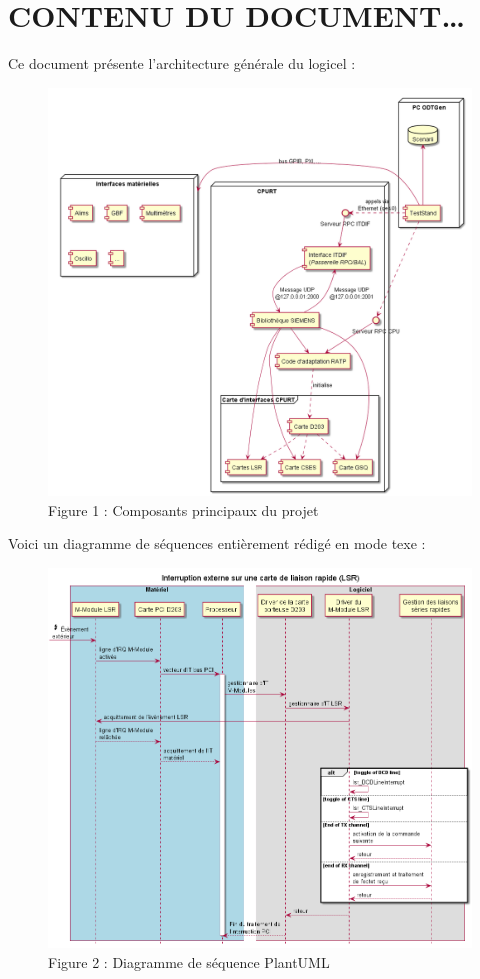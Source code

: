 \documentclass[
  10pt,
]{book}
\begin{document}
\hypertarget{contenu-du-document}{%
\section{CONTENU DU DOCUMENT\ldots{}}\label{contenu-du-document}}

Ce document présente l'architecture générale du logicel :

\begin{figure}
\centering
\includegraphics{./tex2pdf.-1f50f5654d7493c4/ae1a89740bab541d6c24e90760040d81d9c06d87.png}
\caption{Figure 1 : Composants principaux du projet}
\end{figure}

Voici un diagramme de séquences entièrement rédigé en mode texe :

\begin{figure}
\centering
\includegraphics{./tex2pdf.-1f50f5654d7493c4/45ba3739ec0b86aa812dc13714ec55161459beee.png}
\caption{Figure 2 : Diagramme de séquence PlantUML}
\end{figure}
\end{document}
